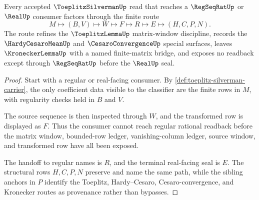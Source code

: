 \begin{theorem}\label{thm:toeplitz-silverman-regular-handoff}
Every accepted $\ToeplitzSilvermanUp$ read that reaches a $\RegSeqRatUp$ or $\RealUp$ consumer factors through the finite route
$$
M \longmapsto (B,V) \longmapsto W \longmapsto F \longmapsto R \longmapsto E \longmapsto (H,C,P,N).
$$
The route refines the $\ToeplitzLemmaUp$ matrix-window discipline, records the $\HardyCesaroMeanUp$ and $\CesaroConvergenceUp$ special surfaces, leaves $\KroneckerLemmaUp$ with a named finite-matrix bridge, and exposes no readback except through $\RegSeqRatUp$ before the $\RealUp$ seal.
\end{theorem}
\begin{proof}
Start with a regular or real-facing consumer. By \autoref{def:toeplitz-silverman-carrier}, the only coefficient data visible to the classifier are the finite rows in $M$, with regularity checks held in $B$ and $V$.

The source sequence is then inspected through $W$, and the transformed row is displayed as $F$. Thus the consumer cannot reach regular rational readback before the matrix window, bounded-row ledger, vanishing-column ledger, source window, and transformed row have all been exposed.

The handoff to regular names is $R$, and the terminal real-facing seal is $E$. The structural rows $H,C,P,N$ preserve and name the same path, while the sibling anchors in $P$ identify the Toeplitz, Hardy--Cesaro, Cesaro-convergence, and Kronecker routes as provenance rather than bypasses.
\end{proof}




